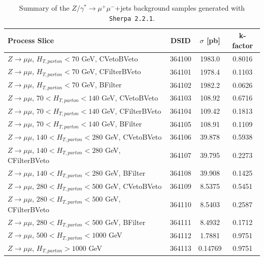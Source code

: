 \begin{table}[htbp]
\centering
\scriptsize
\begin{tabularx}{400pt}{|X||c|c|c|}
\hline
\centering \textbf{Process Slice} & \textbf{DSID} & \textbf{$\sigma$ [pb]} & \textbf{k-factor}\\
\hline
$Z\rightarrow \mu\mu$, $H_{T,parton} < 70$ GeV, CVetoBVeto & 364100 & 1983.0 & 0.8016 \\ \hline
$Z\rightarrow \mu\mu$, $H_{T,parton} < 70$ GeV, CFilterBVeto & 364101 & 1978.4 & 0.1103 \\ \hline
$Z\rightarrow \mu\mu$, $H_{T,parton} < 70$ GeV, BFilter & 364102 & 1982.2 & 0.0626 \\ \hline
$Z\rightarrow \mu\mu$, $70 < H_{T,parton} < 140$ GeV, CVetoBVeto & 364103 & 108.92 & 0.6716 \\ \hline
$Z\rightarrow \mu\mu$, $70 < H_{T,parton} < 140$ GeV, CFilterBVeto & 364104 & 109.42 & 0.1813 \\ \hline
$Z\rightarrow \mu\mu$, $70 < H_{T,parton} < 140$ GeV, BFilter & 364105 & 108.91 & 0.1109 \\ \hline
$Z\rightarrow \mu\mu$, $140 < H_{T,parton} < 280$ GeV, CVetoBVeto & 364106 & 39.878 & 0.5938 \\ \hline
$Z\rightarrow \mu\mu$, $140 < H_{T,parton} < 280$ GeV, CFilterBVeto & 364107 & 39.795 & 0.2273 \\ \hline
$Z\rightarrow \mu\mu$, $140 < H_{T,parton} < 280$ GeV, BFilter & 364108 & 39.908 & 0.1425 \\ \hline
$Z\rightarrow \mu\mu$, $280 < H_{T,parton} < 500$ GeV, CVetoBVeto & 364109 & 8.5375 & 0.5451 \\ \hline
$Z\rightarrow \mu\mu$, $280 < H_{T,parton} < 500$ GeV, CFilterBVeto & 364110 & 8.5403 & 0.2587 \\ \hline
$Z\rightarrow \mu\mu$, $280 < H_{T,parton} < 500$ GeV, BFilter & 364111 & 8.4932 & 0.1712 \\ \hline
$Z\rightarrow \mu\mu$, $500 < H_{T,parton} < 1000$ GeV & 364112 & 1.7881 & 0.9751 \\ \hline
$Z\rightarrow \mu\mu$, $H_{T,parton} > 1000$ GeV & 364113 & 0.14769 & 0.9751 \\ \hline
\end{tabularx}
\caption{\rm Summary of the $Z/\gamma^* \to \mu^+\mu^-$+jets background samples generated with \texttt{Sherpa~2.2.1}.}
\label{tab:ZjetsSamplesSherpa2}
\end{table}

